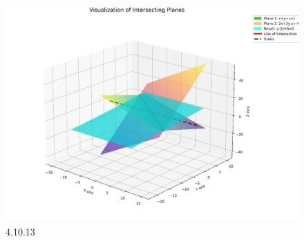 \documentclass[journal]{IEEEtran}
\begin{document}
\begin{figure}[H]
    \centering
    \includegraphics[width=0.85\columnwidth]{figs/graph.png}
    \caption{4.10.13}
    \label{fig:4.10.13}
\end{figure}
\end{document}
